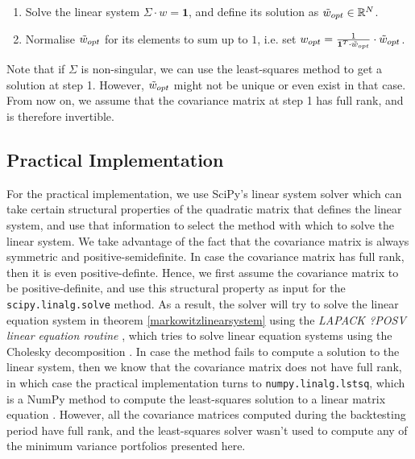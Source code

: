     \begin{enumerate}
        \item Solve the linear system $\Sigma \cdot w = \mathbf{1}$, and define its solution as $\Tilde{w}_{opt} \in \mathbb{R}^N$.
        \item Normalise $\Tilde{w}_{opt}$ for its elements to sum up to $1$, i.e. set $w_{opt} = \frac{1}{\mathbf{1}^T \cdot \Tilde{w}_{opt}} \cdot \Tilde{w}_{opt}$.
    \end{enumerate}
    
    Note that if $\Sigma$ is non-singular, we can use the least-squares method to get a solution at step 1. However, $\Tilde{w}_{opt}$ might not be unique or even exist in that case. From now on, we assume that the covariance matrix at step 1 has full rank, and is therefore invertible.
    
    
\subsection{Practical Implementation}\label{markowitzpracticalimplementationsec}
	
	For the practical implementation, we use SciPy's linear system solver which can take certain structural properties of the quadratic matrix that defines the linear system, and use that information to select the method with which to solve the linear system. We take advantage of the fact that the covariance matrix is always symmetric and positive-semidefinite. In case the covariance matrix has full rank, then it is even positive-definte. Hence, we first assume the covariance matrix to be positive-definite, and use this structural property as input for the \texttt{scipy.linalg.solve} method. As a result, the solver will try to solve the linear equation system in theorem \ref{markowitzlinearsystem} using the \textit{LAPACK ?POSV linear equation routine} \cite{scipylinalgsolve}, which tries to solve linear equation systems using the Cholesky decomposition \cite{lapackposv}. In case the method fails to compute a solution to the linear system, then we know that the covariance matrix does not have full rank, in which case the practical implementation turns to \texttt{numpy.linalg.lstsq}, which is a NumPy method to compute the least-squares solution to a linear matrix equation \cite{lstsqnumpy}. However, all the covariance matrices computed during the backtesting period have full rank, and the least-squares solver wasn't used to compute any of the minimum variance portfolios presented here.
	
